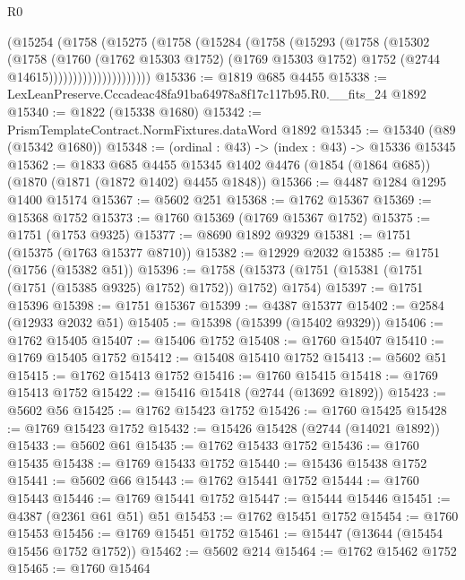 \begin{lexlean}{R0}
\begin{coremodule}
                      (@15254
                        (@1758
                          (@15275
                            (@1758
                              (@15284
                                (@1758
                                  (@15293
                                    (@1758
                                      (@15302
                                        (@1758
                                          (@1760
                                            (@1762 @15303 @1752)
                                            (@1769 @15303 @1752)
                                            @1752
                                            (@2744 @14615)))))))))))))))))))))
@15336 := @1819 @685 @4455
@15338 := LexLeanPreserve.Cccadeac48fa91ba64978a8f17c117b95.R0.__fits_24 @1892
@15340 := @1822 (@15338 @1680)
@15342 := PrismTemplateContract.NormFixtures.dataWord @1892
@15345 := @15340 (@89 (@15342 @1680))
@15348 := (ordinal : @43) -> (index : @43) -> @15336 @15345
@15362 := @1833
    @685
    @4455
    @15345
    @1402
    @4476
    (@1854 (@1864 @685))
    (@1870 (@1871 (@1872 @1402) @4455 @1848))
@15366 := @4487 @1284 @1295 @1400 @15174
@15367 := @5602 @251
@15368 := @1762 @15367
@15369 := @15368 @1752
@15373 := @1760 @15369 (@1769 @15367 @1752)
@15375 := @1751 (@1753 @9325)
@15377 := @8690 @1892 @9329
@15381 := @1751 (@15375 (@1763 @15377 @8710))
@15382 := @12929 @2032
@15385 := @1751 (@1756 (@15382 @51))
@15396 := @1758 (@15373 (@1751 (@15381 (@1751 (@1751 (@15385 @9325) @1752) @1752)) @1752) @1754)
@15397 := @1751 @15396
@15398 := @1751 @15367
@15399 := @4387 @15377
@15402 := @2584 (@12933 @2032 @51)
@15405 := @15398 (@15399 (@15402 @9329))
@15406 := @1762 @15405
@15407 := @15406 @1752
@15408 := @1760 @15407
@15410 := @1769 @15405 @1752
@15412 := @15408 @15410 @1752
@15413 := @5602 @51
@15415 := @1762 @15413 @1752
@15416 := @1760 @15415
@15418 := @1769 @15413 @1752
@15422 := @15416 @15418 (@2744 (@13692 @1892))
@15423 := @5602 @56
@15425 := @1762 @15423 @1752
@15426 := @1760 @15425
@15428 := @1769 @15423 @1752
@15432 := @15426 @15428 (@2744 (@14021 @1892))
@15433 := @5602 @61
@15435 := @1762 @15433 @1752
@15436 := @1760 @15435
@15438 := @1769 @15433 @1752
@15440 := @15436 @15438 @1752
@15441 := @5602 @66
@15443 := @1762 @15441 @1752
@15444 := @1760 @15443
@15446 := @1769 @15441 @1752
@15447 := @15444 @15446
@15451 := @4387 (@2361 @61 @51) @51
@15453 := @1762 @15451 @1752
@15454 := @1760 @15453
@15456 := @1769 @15451 @1752
@15461 := @15447 (@13644 (@15454 @15456 @1752 @1752))
@15462 := @5602 @214
@15464 := @1762 @15462 @1752
@15465 := @1760 @15464

\end{coremodule}
\end{lexlean}
